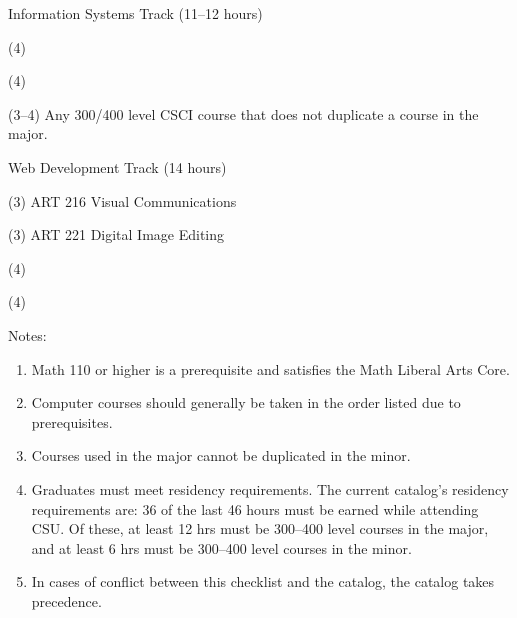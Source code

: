 \begin{reqgroup}{Information Systems Track (11--12 hours)}
\begin{checklist}
	\item (4) 
	\item (4) 
	\item (3--4) Any 300/400 level CSCI course that does not duplicate a course in the major.
\end{checklist}
\end{reqgroup}

\begin{reqgroup}{Web Development Track (14 hours)}
\begin{checklist}
	\item (3) ART 216 Visual Communications
	\item (3) ART 221 Digital Image Editing
	\item (4) 
	\item (4) 
\end{checklist}
\end{reqgroup}

Notes:%
\begin{enumerate}\footnotesize
	\item Math 110 or higher is a prerequisite and satisfies the Math Liberal Arts Core.
	\item Computer courses should generally be taken in the order listed due to prerequisites.
	\item Courses used in the major cannot be duplicated in the minor.
	\item Graduates must meet residency requirements. The current catalog's residency requirements are: 36 of the last 46 hours must be earned while attending CSU\@. Of these, at least 12 hrs must be 300--400 level courses in the major, and at least 6 hrs must be 300--400 level courses in the minor.
	\item In cases of conflict between this checklist and the catalog, the catalog takes precedence.
\end{enumerate}